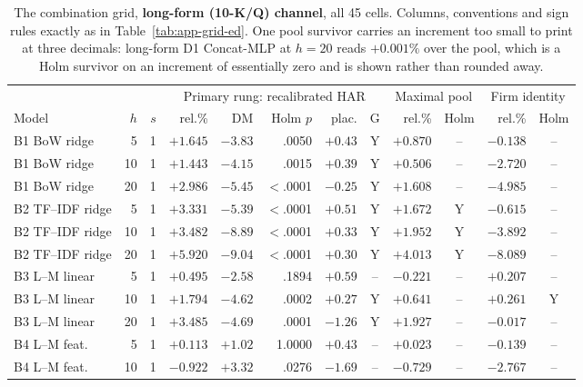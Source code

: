 \begin{table}[p]
\centering
\caption[The 69-cell combination grid: long-form cells]{The combination
grid, \textbf{long-form (10-K/Q) channel}, all 45 cells. Columns,
conventions and sign rules exactly as in Table~\ref{tab:app-grid-ed}.
One pool survivor carries an increment too small to print at three
decimals: long-form D1 Concat-MLP at $h{=}20$ reads $+0.001\%$ over the
pool, which is a Holm survivor on an increment of essentially zero and
is shown rather than rounded away.}
\label{tab:app-grid-lf}
\singlespacing\footnotesize
\setlength{\tabcolsep}{3.5pt}
\begin{tabular}{@{}lrrrrrrcrcrc@{}}
\toprule
& & & \multicolumn{5}{c}{Primary rung: recalibrated HAR} & \multicolumn{2}{c}{Maximal pool} & \multicolumn{2}{c}{Firm identity} \\
\cmidrule(lr){4-8}\cmidrule(lr){9-10}\cmidrule(lr){11-12}
Model & $h$ & $s$ & rel.\% & DM & Holm $p$ & plac. & G & rel.\% & Holm & rel.\% & Holm \\
\midrule
B1 BoW ridge       &  5 & 1 & $+1.645$ & $-3.83$ & .0050 & $+0.43$ & Y & $+0.870$ & -- & $-0.138$ & -- \\
B1 BoW ridge       & 10 & 1 & $+1.443$ & $-4.15$ & .0015 & $+0.39$ & Y & $+0.506$ & -- & $-2.720$ & -- \\
B1 BoW ridge       & 20 & 1 & $+2.986$ & $-5.45$ & $<$.0001 & $-0.25$ & Y & $+1.608$ & -- & $-4.985$ & -- \\
B2 TF--IDF ridge   &  5 & 1 & $+3.331$ & $-5.39$ & $<$.0001 & $+0.51$ & Y & $+1.672$ & Y & $-0.615$ & -- \\
B2 TF--IDF ridge   & 10 & 1 & $+3.482$ & $-8.89$ & $<$.0001 & $+0.33$ & Y & $+1.952$ & Y & $-3.892$ & -- \\
B2 TF--IDF ridge   & 20 & 1 & $+5.920$ & $-9.04$ & $<$.0001 & $+0.30$ & Y & $+4.013$ & Y & $-8.089$ & -- \\
B3 L--M linear     &  5 & 1 & $+0.495$ & $-2.58$ & .1894 & $+0.59$ & -- & $-0.221$ & -- & $+0.207$ & -- \\
B3 L--M linear     & 10 & 1 & $+1.794$ & $-4.62$ & .0002 & $+0.27$ & Y & $+0.641$ & -- & $+0.261$ & Y \\
B3 L--M linear     & 20 & 1 & $+3.485$ & $-4.69$ & .0001 & $-1.26$ & Y & $+1.927$ & -- & $-0.017$ & -- \\
B4 L--M feat.      &  5 & 1 & $+0.113$ & $+1.02$ & 1.0000 & $+0.43$ & -- & $+0.023$ & -- & $-0.139$ & -- \\
B4 L--M feat.      & 10 & 1 & $-0.922$ & $+3.32$ & .0276 & $-1.69$ & -- & $-0.729$ & -- & $-2.767$ & -- \\

\end{tabular}
\end{table}
